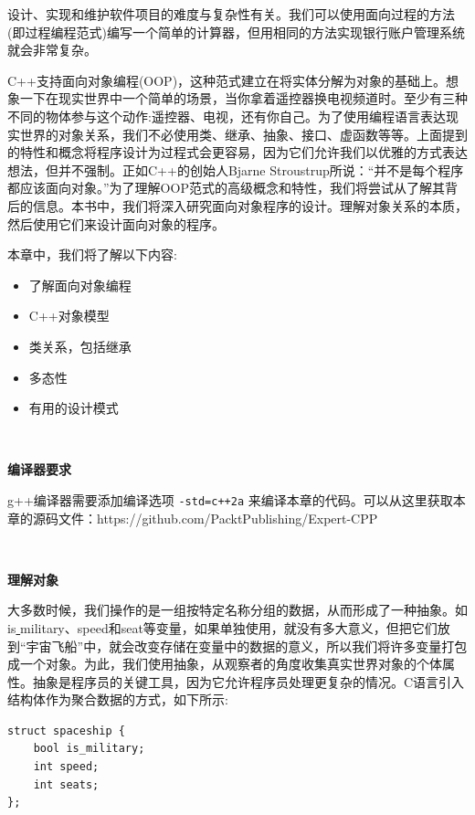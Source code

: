 设计、实现和维护软件项目的难度与复杂性有关。我们可以使用面向过程的方法(即过程编程范式)编写一个简单的计算器，但用相同的方法实现银行账户管理系统就会非常复杂。 \par
C++支持面向对象编程(OOP)，这种范式建立在将实体分解为对象的基础上。想象一下在现实世界中一个简单的场景，当你拿着遥控器换电视频道时。至少有三种不同的物体参与这个动作:遥控器、电视，还有你自己。为了使用编程语言表达现实世界的对象关系，我们不必使用类、继承、抽象、接口、虚函数等等。上面提到的特性和概念将程序设计为过程式会更容易，因为它们允许我们以优雅的方式表达想法，但并不强制。正如C++的创始人Bjarne Stroustrup所说：“并不是每个程序都应该面向对象。”为了理解OOP范式的高级概念和特性，我们将尝试从了解其背后的信息。本书中，我们将深入研究面向对象程序的设计。理解对象关系的本质，然后使用它们来设计面向对象的程序。 \par
本章中，我们将了解以下内容: \par

\begin{itemize}
	\item 了解面向对象编程
	\item C++对象模型
	\item 类关系，包括继承
	\item 多态性
	\item 有用的设计模式
\end{itemize}

\noindent\textbf{}\ \par
\textbf{编译器要求} \ \par
g++编译器需要添加编译选项 \texttt{-std=c++2a} 来编译本章的代码。可以从这里获取本章的源码文件：https:/​/github.​com/PacktPublishing/Expert-CPP \par

\noindent\textbf{}\ \par
\textbf{理解对象} \ \par
大多数时候，我们操作的是一组按特定名称分组的数据，从而形成了一种抽象。如is\underline{ }military、speed和seat等变量，如果单独使用，就没有多大意义，但把它们放到“宇宙飞船”中，就会改变存储在变量中的数据的意义，所以我们将许多变量打包成一个对象。为此，我们使用抽象，从观察者的角度收集真实世界对象的个体属性。抽象是程序员的关键工具，因为它允许程序员处理更复杂的情况。C语言引入结构体作为聚合数据的方式，如下所示:\par

\begin{lstlisting}[caption={}]
struct spaceship {
	bool is_military;
	int speed;
	int seats;
};
\end{lstlisting}

